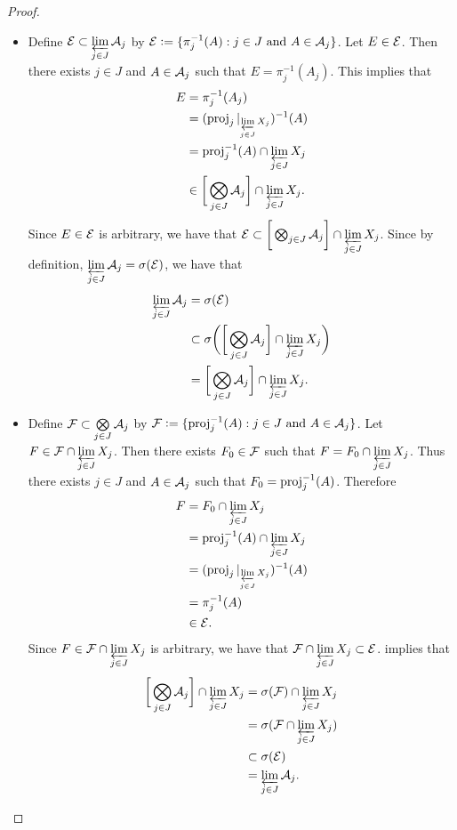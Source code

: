 \documentclass{book}
\begin{document}
\begin{proof}\
	\begin{itemize}
		\item Define $\mathcal{E} \subset \varprojlim\limits_{j \in J} \mathcal{A}_j$ by $\mathcal{E} \vcentcolon= \{\pi_j^{-1}(A): j \in J \text{ and } A \in \mathcal{A}_j\}$. Let $E \in \mathcal{E}$. Then there exists $j \in J$ and $A \in \mathcal{A}_j$ such that $E = \pi_j^{-1}(A_j)$. This implies that
		\begin{align*}
			E
			& = \pi_j^{-1}(A_j) \\
			& = (\operatorname{\text{proj}}_j|_{\varprojlim\limits_{j \in J} X_j})^{-1}(A) \\
			& = \operatorname{\text{proj}}_j^{-1}(A) \cap \varprojlim\limits_{j \in J} X_j \\
			& \in \bigg[ \bigotimes_{j \in J} \mathcal{A}_j \bigg] \cap \varprojlim\limits_{j \in J} X_j.
		\end{align*}
		Since $E \in \mathcal{E}$ is arbitrary, we have that $\mathcal{E} \subset \bigg[ \bigotimes_{j \in J} \mathcal{A}_j \bigg] \cap \varprojlim\limits_{j \in J} X_j$. Since by definition, $\varprojlim\limits_{j \in J}  \mathcal{A}_j = \sigma(\mathcal{E})$, we have that  
		\begin{align*}
			\varprojlim\limits_{j \in J} \mathcal{A}_j
			& = \sigma(\mathcal{E}) \\
			& \subset \sigma \bigg( \bigg[ \bigotimes_{j \in J} \mathcal{A}_j \bigg] \cap \varprojlim\limits_{j \in J} X_j \bigg) \\
			& = \bigg[ \bigotimes_{j \in J} \mathcal{A}_j \bigg] \cap \varprojlim\limits_{j \in J} X_j.
		\end{align*}
		\item Define $\mathcal{F} \subset \bigotimes\limits_{j \in J} \mathcal{A}_j$ by $\mathcal{F} \vcentcolon= \{\operatorname{\text{proj}}_j^{-1}(A): j \in J \text{ and } A \in \mathcal{A}_j\}$. Let $F \in \mathcal{F} \cap \varprojlim\limits_{j \in J} X_j$. Then there exists $F_0 \in \mathcal{F}$ such that $F = F_0 \cap \varprojlim\limits_{j \in J} X_j$. Thus there exists $j \in J$ and $A \in \mathcal{A}_j$ such that $F_0 = \operatorname{\text{proj}}_j^{-1}(A)$. Therefore
		\begin{align*}
			F
			& = F_0 \cap \varprojlim\limits_{j \in J} X_j \\
			& = \operatorname{\text{proj}}_j^{-1}(A) \cap \varprojlim\limits_{j \in J} X_j \\
			& = (\operatorname{\text{proj}}_j|_{\varprojlim\limits_{j \in J} X_j})^{-1}(A) \\
			& = \pi_j^{-1}(A) \\
			& \in \mathcal{E}. 
		\end{align*}
		Since $F \in \mathcal{F} \cap \varprojlim\limits_{j \in J} X_j$ is arbitrary, we have that $\mathcal{F} \cap \varprojlim\limits_{j \in J} X_j \subset \mathcal{E}$.  implies that
		\begin{align*}
			\bigg [ \bigotimes_{j \in J} \mathcal{A}_j \bigg] \cap \varprojlim\limits_{j \in J} X_j 
			& = \sigma(\mathcal{F}) \cap \varprojlim\limits_{j \in J} X_j \\
			& = \sigma(\mathcal{F} \cap \varprojlim\limits_{j \in J} X_j) \\
			& \subset \sigma(\mathcal{E}) \\
			& = \varprojlim\limits_{j \in J} \mathcal{A}_j.
		\end{align*}
	\end{itemize}
\end{proof}
\end{document}
